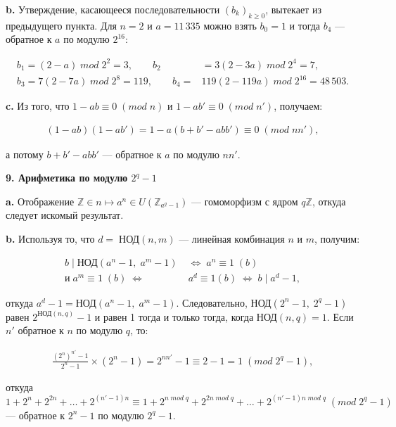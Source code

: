 \documentclass{mai_book}
\begin{document}
\medskip
\textbf{b.} Утверждение, касающееся последовательности $(b_k)_{k\geq0}$, вытекает
из предыдущего пункта.
Для $n=2$ и $a=11\,335$ можно взять $b_0=1$ и
тогда $b_4$ --- обратное к $a$ по модулю $2^{16}$:


$$
\begin{aligned}
b_1=(2-a)\; mod\; 2^2=3,\qquad b_2&=3(2-3a)\; mod\; 2^4=7,\\
b_3=7(2-7a)\; mod\; 2^8=119,\qquad b_4=&119(2-119a)\; mod\; 2^16=48\,503.
\end{aligned}
$$


\newpage


\textbf{c.} Из того, что $1-ab\equiv 0\;(mod\;n)$ и $1-ab'\equiv 0\; (mod\; n')$, получаем: 


$$
\begin{aligned}
(1-ab)(1-ab')=1-a(b+b'-abb')\equiv 0\; (mod\; nn'),
\end{aligned}
$$


\medskip
\noindent а потому $b+b'-abb'$ --- обратное к $a$ по модулю $nn'$.

\bigskip
\noindent \textbf{9. Арифметика по модулю $2^q-1$}

\medskip
\textbf{a.} Отображение $\mathbb{Z}\in n\mapsto a^n\in U(\mathbb{Z}_{a^q-1})$ --- гомоморфизм с ядром $q\mathbb{Z}$, откуда следует искомый результат.

\medskip
\textbf{b.} Используя то, что $d=\;\text{НОД}(n,m)$ --- линейная комбинация $n$ и $m$, получим:


$$
\begin{aligned}
b\;|\; \text{НОД}  (a^n-1,\; a^m-1)\;&\Longleftrightarrow\; a^n\equiv 1\;(b)\\
 \text{и}  \; a^m\equiv 1\; (b)\;\Longleftrightarrow\; &a^d\equiv 1(b)\;\Longleftrightarrow\; b\;|\; a^d-1,
\end{aligned}
$$


\medskip
\noindent откуда $a^d-1=\text{НОД}(a^n-1,\; a^m-1)$. 
Следовательно, НОД$(2^n-1,\; 2^q-1)$ равен $2^{\text{НОД}(n,q)}-1$ и равен 1 тогда и только тогда, когда НОД$(n,q)=1$.
Если $n'$ обратное к $n$ по модулю $q$, то:


$$
\begin{aligned}
\frac{(2^n)^{n'}-1}{2^n-1}\times (2^n-1)=2^{nn'}-1\equiv 2-1=1\; (mod\; 2^q-1),
\end{aligned}
$$


\medskip
\noindent откуда $1+2^n+2^{2n}+\dots+2^{(n'-1)n}\equiv 1+2^{n\; mod\; q}+2^{2n\; mod\; q}+\dots+2^{(n'-1)n\; mod\; q}\; (mod\; 2^q-1)$ --- обратное к $2^n-1$ по модулю $2^q-1$.
\end{document}

